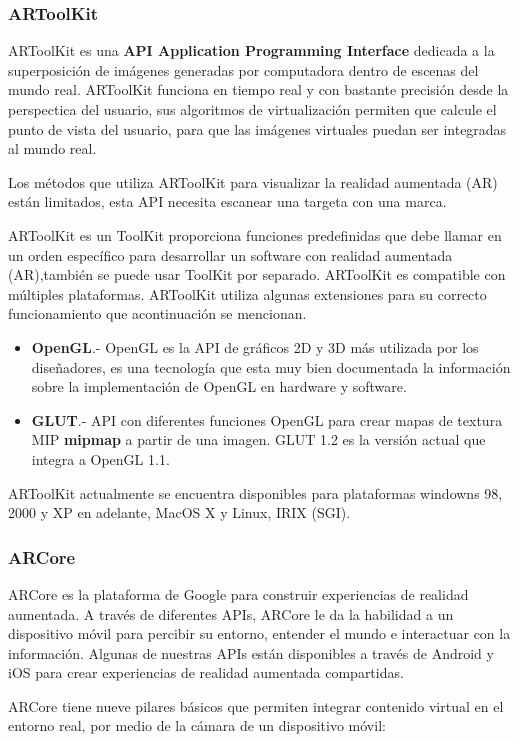 \subsubsection{ARToolKit}
ARToolKit es una \textbf{API Application Programming Interface} dedicada a la superposición de imágenes generadas por computadora dentro de escenas del mundo real. ARToolKit funciona en tiempo real y con bastante precisión desde la perspectica del usuario, sus algoritmos de virtualización permiten que calcule el punto de vista del usuario, para que las imágenes virtuales puedan ser integradas al mundo real.\cite{B07}\par
Los métodos que utiliza ARToolKit para visualizar la realidad aumentada (AR) están limitados, esta API necesita escanear una targeta con una marca.\cite{B07}\par
ARToolKit es un ToolKit proporciona funciones predefinidas que debe llamar en un orden específico para desarrollar un software con realidad aumentada (AR),también se puede usar ToolKit por separado. ARToolKit es compatible con múltiples plataformas.  ARToolKit utiliza algunas extensiones para su correcto funcionamiento que acontinuación se mencionan.

\begin{itemize}
	\item \textbf{OpenGL}.- OpenGL es la API de gráficos 2D y 3D más  utilizada por los diseñadores, es una tecnología que esta muy bien documentada la información sobre la implementación de OpenGL en hardware y software.\cite{B14}
	
	\item \textbf{GLUT}.- API con diferentes funciones OpenGL para crear mapas de textura MIP \textbf{mipmap} a partir de una imagen. GLUT 1.2 es la versión actual que integra a OpenGL 1.1.\cite{B19}
	
\end{itemize}
\noindent
ARToolKit actualmente se encuentra disponibles para plataformas windowns 98, 2000 y XP en adelante, MacOS X y Linux, IRIX (SGI).\cite{B19}

\noindent

\subsubsection{ARCore}
ARCore es la plataforma de Google para construir experiencias de realidad aumentada. A través de diferentes APIs, ARCore le da la habilidad a un dispositivo móvil para percibir su entorno, entender el mundo e interactuar con la información. Algunas de nuestras APIs están disponibles a través de Android y iOS para crear experiencias de realidad aumentada compartidas.\par
ARCore tiene nueve pilares básicos que permiten integrar contenido virtual en el entorno real, por medio de la cámara de un dispositivo móvil:

